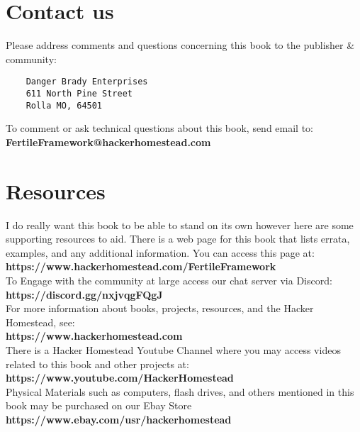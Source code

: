 \section{Contact us}

Please address comments and questions concerning this book to the publisher \& community:
\begin{verbatim}
	Danger Brady Enterprises
	611 North Pine Street
	Rolla MO, 64501
\end{verbatim}

To comment or ask technical questions about this book, send email to:
	\textbf{FertileFramework@hackerhomestead.com}

\section{Resources}

I do really want this book to be able to stand on its own however here are some supporting resources to aid.
There is a web page for this book that lists errata, examples, and any additional information. You can access this page at:\\

	\textbf{https://www.hackerhomestead.com/FertileFramework}\\

To Engage with the community at large access our chat server via Discord:\\

	\textbf{	https://discord.gg/nxjvqgFQgJ}\\

For more information about books, projects, resources, and the Hacker Homestead, see:\\

	\textbf{	https://www.hackerhomestead.com}\\


There is a Hacker Homestead Youtube Channel where you may access videos related to this book and other projects at:\\

	\textbf{https://www.youtube.com/HackerHomestead}\\

Physical Materials such as computers, flash drives, and others mentioned in this book may be purchased on our Ebay Store\\

	\textbf{https://www.ebay.com/usr/hackerhomestead}\\

